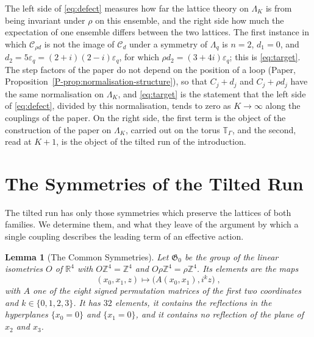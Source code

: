 \documentclass[11pt]{preprint}
\numberwithin{equation}{section}
\newtheorem{lemma}[theorem]{Lemma}
\theoremstyle{definition}
\theoremstyle{remark}
\theoremstyle{plain}
\begin{document}
The left side of \eqref{eq:defect} measures how far the lattice theory on $\Lambda_K$ is from being invariant under $\rho$ on this ensemble, and the right side how much the expectation of one ensemble differs between the two lattices. The first instance in which $\mathcal C_{\rho d}$ is not the image of $\mathcal C_d$ under a symmetry of $\Lambda_q$ is $n = 2$, $d_1 = 0$, and $d_2 = 5\varepsilon_q = (2 + i)(2 - i)\varepsilon_q$, for which $\rho d_2 = (3 + 4i)\varepsilon_q$; this is \eqref{eq:target}. The step factors of the paper do not depend on the position of a loop (Paper, Proposition~\ref{P-prop:normalisation-structure}), so that $C_j + d_j$ and $C_j + \rho d_j$ have the same normalisation on $\Lambda_K$, and \eqref{eq:target} is the statement that the left side of \eqref{eq:defect}, divided by this normalisation, tends to zero as $K \to \infty$ along the couplings of the paper. On the right side, the first term is the object of the construction of the paper on $\Lambda_K$, carried out on the torus $\mathbb T_\Gamma$, and the second, read at $K + 1$, is the object of the tilted run of the introduction.

\section{The Symmetries of the Tilted Run}\label{sec:symmetries}

The tilted run has only those symmetries which preserve the lattices of both families. We determine them, and what they leave of the argument by which a single coupling describes the leading term of an effective action.

\begin{lemma}[The Common Symmetries]\label{lem:common-symmetries}
Let $\mathfrak G_0$ be the group of the linear isometries $O$ of $\mathbb R^4$ with $O\mathbb Z^4 = \mathbb Z^4$ and $O\rho\mathbb Z^4 = \rho\mathbb Z^4$. Its elements are the maps
\begin{equation}\label{eq:common-symmetries}
    (x_0, x_1, z) \mapsto \bigl(A(x_0, x_1), i^kz\bigr)\;,
\end{equation}
with $A$ one of the eight signed permutation matrices of the first two coordinates and $k \in \{ 0, 1, 2, 3 \}$. It has $32$ elements, it contains the reflections in the hyperplanes $\{ x_0 = 0 \}$ and $\{ x_1 = 0 \}$, and it contains no reflection of the plane of $x_2$ and $x_3$.
\end{lemma}
\end{document}
